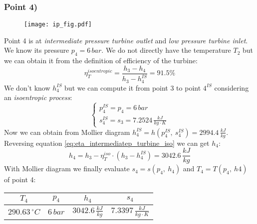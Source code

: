 \documentclass[a4paper,12pt]{article}
\newcommand{\celsius}[0]{\,^{\circ}C}
\newcommand{\kjkg}[0]{\,\frac{kJ}{kg}}
\newcommand{\kjkgk}[0]{\,\frac{kJ}{kg \cdot K}}
\newcommand{\md}[0]{Mollier diagram }
\newcommand{\pointdatatable}[5]{
\begin{center}
\tabulinesep=1.2mm
\begin{tabu}{|c|c|c|c|}
\hline
$ T_{#1} $ & $ p_{#1} $ & $ h_{#1} $ & $ s_{#1} $\\ \hline
$ #2 \celsius $ & $ #3 \,bar $ & $ #4 \kjkg $ & $ #5 \kjkgk $\\ \hline
\end{tabu}
\end{center}
}
\begin{document}
\subsubsection*{Point 4)}
\begin{wrapfigure}{L}{2cm}
    \texttt{[image: ip\_fig.pdf]}
\end{wrapfigure}
Point 4 is at \emph{intermediate pressure turbine outlet} and \emph{low pressure turbine inlet}. We know its pressure $p_4=6\,bar$. We do not directly have the temperature $T_2$ but we can obtain it from the definition of efficiency of the turbine:
\begin{equation}
\label{eq:eta_intermediatep_turbine_iso}
\eta_T^{isoentropic} = \frac{h_3-h_4}{h_3-h_4^{IS}} = 91.5\%
\end{equation}
We don't know $h_4^{IS}$ but we can compute it from point 3 to point $4^{IS}$ considering an \emph{isoentropic process}:
\[\begin{cases}{}
p_4^{IS} = p_4 = 6 \,bar \\ 
s_4^{IS} = s_3 = 7.2524 \kjkgk
\end{cases}\]
Now we can obtain from \md $h_4^{IS} = h(p_4^{IS},\ s_4^{IS}) = 2994.4 \kjkg$.
\\Reversing equation \ref{eq:eta_intermediatep_turbine_iso} we can get $h_4$:
\begin{equation}
h_4=h_3-\eta_T^{iso} \cdot \left(h_3 - h_4^{IS} \right) = 3042.6 \kjkg
\end{equation}
With \md we finally evaluate $s_4 = s(p_4,\ h_4)$ and $T_4 = T(p_4,\ h4)$ of point 4:
\pointdatatable{4}{290.63}{6}{3042.6}{7.3397}
%
%
%
\end{document}
